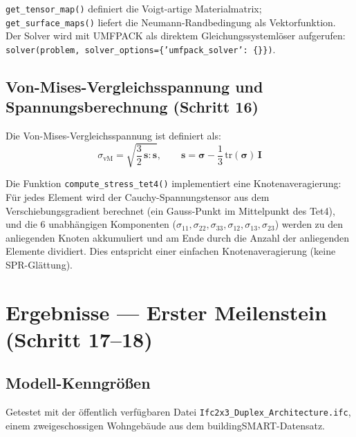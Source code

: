 \documentclass[a4paper,11pt]{article}
\begin{document}
\texttt{get\_tensor\_map()} definiert die Voigt-artige Materialmatrix; \texttt{get\_surface\_maps()} liefert die Neumann-Randbedingung als Vektorfunktion. Der Solver wird mit UMFPACK als direktem Gleichungssystemlöser aufgerufen: \texttt{solver(problem, solver\_options=\{'umfpack\_solver': \{\}\})}.

\subsection{Von-Mises-Vergleichsspannung und Spannungsberechnung (Schritt 16)}

Die Von-Mises-Vergleichsspannung ist definiert als:
\begin{equation}
  \sigma_\text{vM} = \sqrt{\frac{3}{2}\,\mathbf{s}:\mathbf{s}},
  \qquad \mathbf{s} = \boldsymbol{\sigma} - \frac{1}{3}\,\mathrm{tr}(\boldsymbol{\sigma})\,\mathbf{I}
\end{equation}

Die Funktion \texttt{compute\_stress\_tet4()} implementiert eine Knotenaveragierung: Für jedes Element wird der Cauchy-Spannungstensor aus dem Verschiebungsgradient berechnet (ein Gauss-Punkt im Mittelpunkt des Tet4), und die 6 unabhängigen Komponenten ($\sigma_{11}, \sigma_{22}, \sigma_{33}, \sigma_{12}, \sigma_{13}, \sigma_{23}$) werden zu den anliegenden Knoten akkumuliert und am Ende durch die Anzahl der anliegenden Elemente dividiert. Dies entspricht einer einfachen Knotenaveragierung (keine SPR-Glättung).

\section{Ergebnisse — Erster Meilenstein (Schritt 17--18)}

\subsection{Modell-Kenngrößen}

Getestet mit der öffentlich verfügbaren Datei \texttt{Ifc2x3\_Duplex\_Architecture.ifc}, einem zweigeschossigen Wohngebäude aus dem buildingSMART-Datensatz.
\end{document}
